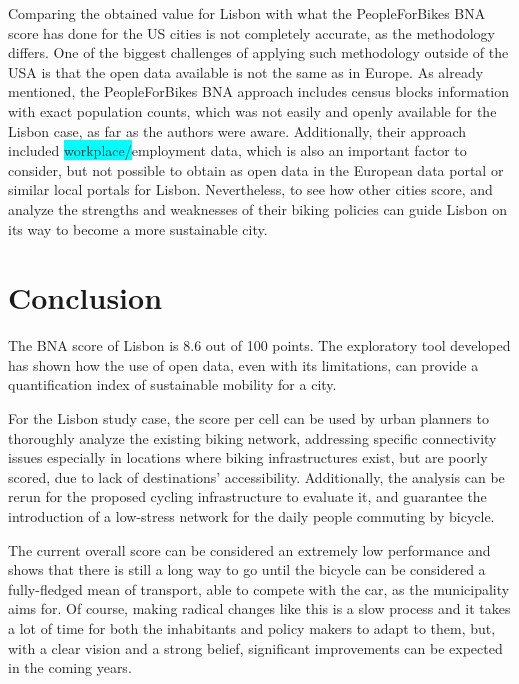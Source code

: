 \documentclass[information,article,submit,moreauthors,pdftex,10pt,a4paper]{mdpi}
\theoremstyle{mdpi}
\newcounter{ex}
\newcounter{re}
\theoremstyle{mdpidefinition}
\begin{document}
Comparing the obtained value for Lisbon with what the PeopleForBikes BNA score has done for the US cities is not completely accurate, as the methodology differs. One of the biggest challenges of applying such methodology outside of the USA is that the open data available is not the same as in Europe. As already mentioned, the PeopleForBikes BNA approach includes census blocks information with exact population counts, which was not easily and openly available for the Lisbon case, as far as the authors were aware. Additionally, their approach included \colorbox{cyan}{workplace/}employment data, which is also an important factor to consider, but not possible to obtain as open data in the European data portal or similar local portals for Lisbon. Nevertheless, to see how other cities score, and analyze the strengths and weaknesses of their biking policies can guide Lisbon on its way to become a more sustainable city. 

\section{Conclusion} \label{conclusion}

The BNA score of Lisbon is 8.6 out of 100 points. The exploratory tool developed has shown how the use of open data, even with its limitations, can provide a quantification index of sustainable mobility for a city. 
\begin{mycolorbox}[colback=orange]
For the Lisbon study case, the score per cell can be used by urban planners to thoroughly analyze the existing biking network, addressing specific connectivity issues especially in locations where biking infrastructures exist, but are poorly scored, due to lack of destinations' accessibility. Additionally, the analysis can be rerun for the proposed cycling infrastructure to evaluate it, and guarantee the introduction of a low-stress network for the daily people commuting by bicycle. 
\end{mycolorbox}

The current overall score can be considered an extremely low performance and shows that there is still a long way to go until the bicycle can be considered a fully-fledged mean of transport, able to compete with the car, as the municipality aims for. Of course, making radical changes like this is a slow process and it takes a lot of time for both the inhabitants and policy makers to adapt to them, but, with a clear vision and a strong belief, significant improvements can be expected in the coming years. 
\end{document}
